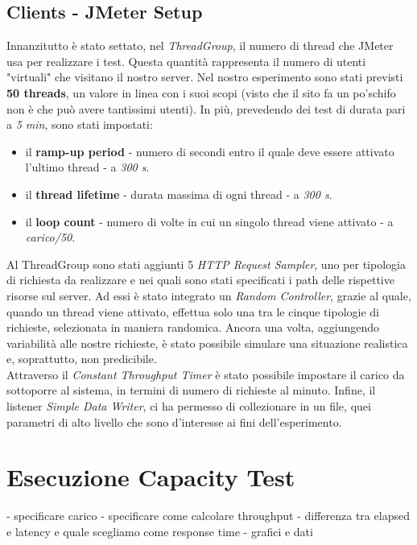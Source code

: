 \subsection{Clients - JMeter Setup}
Innanzitutto è stato settato, nel \textit{ThreadGroup}, il numero di thread che JMeter usa per realizzare i test. Questa quantità rappresenta il numero di utenti "virtuali" che visitano il nostro server. Nel nostro esperimento sono stati previsti \textbf{50 threads}, un valore in linea con i suoi scopi (visto che il sito fa un po'schifo non è che può avere tantissimi utenti). In più, prevedendo dei test di durata pari a \textit{5 min}, sono stati impostati:
\begin{itemize}
	\item il \textbf{ramp-up period} - numero di secondi entro il quale deve essere attivato l'ultimo thread - a \textit{300 s}.
	\item il \textbf{thread lifetime} - durata massima di ogni thread - a \textit{300 s}.
	\item il \textbf{loop count} - numero di volte in cui un singolo thread viene attivato - a \textit{carico/50}.
\end{itemize}     
Al ThreadGroup sono stati aggiunti 5 \textit{HTTP Request Sampler}, uno per tipologia di richiesta da realizzare e nei quali sono stati specificati i path delle rispettive risorse sul server. Ad essi è stato integrato un \textit{Random Controller}, grazie al quale, quando un thread viene attivato, effettua solo una tra le cinque tipologie di richieste, selezionata in maniera randomica. Ancora una volta, aggiungendo variabilità alle nostre richieste, è stato possibile simulare una situazione realistica e, soprattutto, non predicibile.
\\
Attraverso il \textit{Constant Throughput Timer} è stato possibile impostare il carico da sottoporre al sistema, in termini di numero di richieste al minuto. Infine, il listener \textit{Simple Data Writer}, ci ha permesso di collezionare in un file, quei parametri di alto livello che sono d'interesse ai fini dell'esperimento.

\section{Esecuzione Capacity Test}
- specificare carico
- specificare come calcolare throughput
- differenza tra elapsed e latency e quale scegliamo come response time
- grafici e dati
